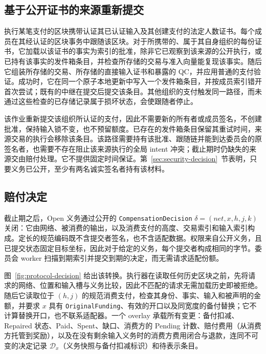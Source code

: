 \subsection{基于公开证书的来源重新提交}
\label{sec:protocol-resubmission}

执行某笔支付的区块携带认证其已认证输入及其创建支付的法定人数证书。每个成员在其经认证的区块事务中跟随该区块。对于所携带的、属于其自身组织的每份证书，它加载以该证书的事实为索引的批准，除非它已观察到该来源的公开执行，或已持有该事实的发件箱条目，并检查所存储的交易与准入向量能复现该事实。随后它组装所存储的交易、所存储的直接输入证书和暴露的 QC，并应用普通的支付验证。成功时，它在同一个原子本地更新中写入一个发件箱条目，并按成员索引错开首次尝试；既有的中继在提交后提交该条目。其他组织的支付触发同一路径，而未通过这些检查的已存储记录属于损坏状态，会使跟随者停止。

该作业重新提交该组织所认证的支付，因此不需要新的所有者或成员签名，不创建批准，保持输入锁不变，也不预留额度。已存在的发件箱条目保留其重试时间，来源交易的执行会移除该条目。该路径需要持有该批准、跟随链并能到达委员会的原签名者，也需要不存在阻止该来源执行的全局 intent 冲突；截止期时仍缺失的来源交由赔付处理。它不提供固定时间保证。第~\ref{sec:security-decision}~节表明，只要义务已公开，至少有两名诚实签名者持有该材料。

\subsection{赔付决定}
\label{sec:protocol-decision}

截止期之后，Open 义务通过公开的 \texttt{CompensationDecision} $\delta=(\mathit{net},x,h,j,k)$ 关闭：它由网络、被消费的输出，以及消费支付的高度、交易索引和输入索引构成。定长的规范编码既不含提交者签名，也不含适配数据。权限来自公开义务，且已提交状态固定目标坐标，因此对于给定的义务，每个提交者构成相同的字节。委员会 worker 扫描到期索引并提交到期的决定，而无需请求适配份额。

图~\ref{fig:protocol-decision} 给出该转换。执行器在读取任何历史区块之前，先将请求的网络、位置和输入槽与义务比较，因此不匹配的请求无需加载历史即被拒绝。随后它读取位于 $(h,j)$ 的规范消费支付，检查其身份、事实、输入和被声明的金额，并要求 $x$ 具有 \texttt{OriginalFunding}、有效的开口以及同宽度的备付替换；它不计算替换开口，也不联系适配器。一个 overlay 承载所有变更：备付扣减、Repaired 状态、Paid、Spent、缺口、消费方的 Pending 计数、赔付费用（从消费方托管到奖励），以及在没有剩余输入义务时的消费方费用闭合与退款，连同不可变的决定记录 $\mathcal D_x$（义务快照与备付扣减标识）和待表示条目。

